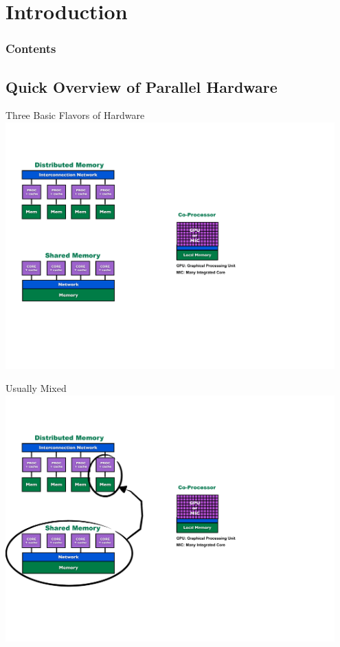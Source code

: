 \section{Introduction}

\hidenum
\begin{frame}[noframenumbering]
\frametitle{Contents}
 \tableofcontents[currentsection,hideothersubsections,sectionstyle=show/hide]
\end{frame}
\shownum

\subsection{Quick Overview of Parallel Hardware}

\begin{frame}
\begin{block}{Three Basic Flavors of Hardware}
    \includegraphics[width=0.95\textwidth]{pics/ParallelHardware1.pdf}
\end{block}
\end{frame}

\begin{frame}
\begin{block}{Usually Mixed}
    \includegraphics[width=0.95\textwidth]{pics/ParallelHardware2.pdf}
\end{block}
\end{frame}

